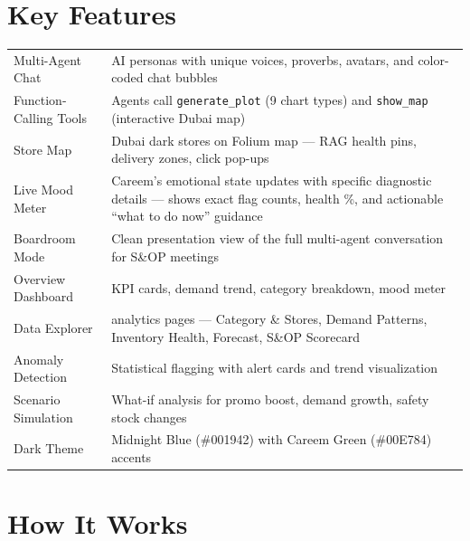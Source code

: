 \documentclass[11pt,a4paper]{article}
\begin{document}
\section{Key Features}

\begin{tabularx}{\textwidth}{@{}>{\raggedright\arraybackslash}p{}>{\raggedright\arraybackslash}p{}@{}}
\toprule
\multicolumn{1}{c}{\textbf{Category}} & \multicolumn{1}{c}{\textbf{Capabilities}} \\
\midrule
Multi-Agent Chat & 3 AI personas with unique voices, proverbs, avatars, and color-coded chat bubbles \\
\addlinespace
Function-Calling Tools & Agents call \texttt{generate\_plot} (9 chart types) and \texttt{show\_map} (interactive Dubai map) \\
\addlinespace
Store Map & 5 Dubai dark stores on Folium map --- RAG health pins, delivery zones, click pop-ups \\
\addlinespace
Live Mood Meter & Careem's emotional state updates with specific diagnostic details --- shows exact flag counts, health \%, and actionable ``what to do now'' guidance \\
\addlinespace
Boardroom Mode & Clean presentation view of the full multi-agent conversation for S\&OP meetings \\
\addlinespace
Overview Dashboard & KPI cards, demand trend, category breakdown, mood meter \\
\addlinespace
Data Explorer & 7 analytics pages --- Category \& Stores, Demand Patterns, Inventory Health, Forecast, S\&OP Scorecard \\
\addlinespace
Anomaly Detection & Statistical flagging with alert cards and trend visualization \\
\addlinespace
Scenario Simulation & What-if analysis for promo boost, demand growth, safety stock changes \\
\addlinespace
Dark Theme & Midnight Blue (\#001942) with Careem Green (\#00E784) accents \\
\bottomrule
\end{tabularx}

\section{How It Works}
\end{document}
